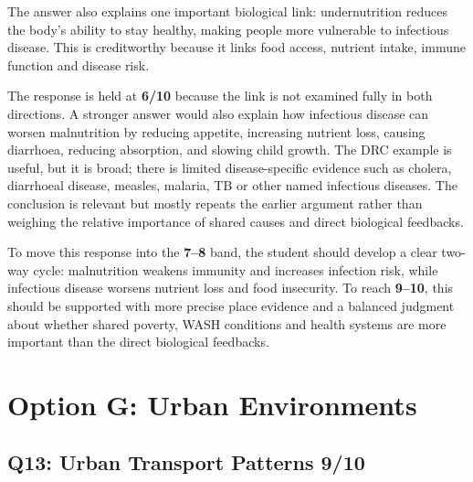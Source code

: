 \documentclass[11pt,a4paper]{article}
\newcommand{\score}[1]{\textcolor{AccentTeal}{\textbf{#1}}}
\begin{document}
The answer also explains one important biological link: undernutrition reduces
the body's ability to stay healthy, making people more vulnerable to
infectious disease. This is creditworthy because it links food access,
nutrient intake, immune function and disease risk.

The response is held at \score{6/10} because the link is not examined fully in
both directions. A stronger answer would also explain how infectious disease
can worsen malnutrition by reducing appetite, increasing nutrient loss, causing
diarrhoea, reducing absorption, and slowing child growth. The DRC example is
useful, but it is broad; there is limited disease-specific evidence such as
cholera, diarrhoeal disease, measles, malaria, TB or other named infectious
diseases. The conclusion is relevant but mostly repeats the earlier argument
rather than weighing the relative importance of shared causes and direct
biological feedbacks.

To move this response into the \score{7--8} band, the student should develop a
clear two-way cycle: malnutrition weakens immunity and increases infection
risk, while infectious disease worsens nutrient loss and food insecurity. To
reach \score{9--10}, this should be supported with more precise place evidence
and a balanced judgment about whether shared poverty, WASH conditions and
health systems are more important than the direct biological feedbacks.

\section{Option G: Urban Environments}

\subsection{Q13: Urban Transport Patterns \score{9/10}}
\end{document}
